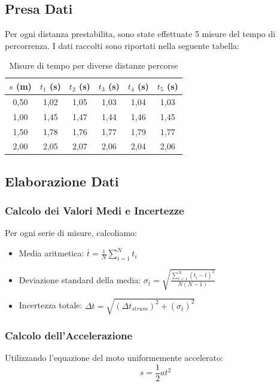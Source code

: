 \subsection{Presa Dati}
Per ogni distanza prestabilita, sono state effettuate 5 misure del tempo di percorrenza. I dati raccolti sono riportati nella seguente tabella:

\begin{table}[H]
\centering
\caption{Misure di tempo per diverse distanze percorse}
\label{tab:misure}
\begin{tabular}{cccccc}
\toprule
$s$ (m) & $t_1$ (s) & $t_2$ (s) & $t_3$ (s) & $t_4$ (s) & $t_5$ (s) \\
\midrule
0,50 & 1,02 & 1,05 & 1,03 & 1,04 & 1,03 \\
1,00 & 1,45 & 1,47 & 1,44 & 1,46 & 1,45 \\
1,50 & 1,78 & 1,76 & 1,77 & 1,79 & 1,77 \\
2,00 & 2,05 & 2,07 & 2,06 & 2,04 & 2,06 \\
\bottomrule
\end{tabular}
\end{table}

\subsection{Elaborazione Dati}

\subsubsection{Calcolo dei Valori Medi e Incertezze}
Per ogni serie di misure, calcoliamo:
\begin{itemize}
    \item Media aritmetica: $\bar{t} = \frac{1}{N}\sum_{i=1}^N t_i$
    \item Deviazione standard della media: $\sigma_{\bar{t}} = \sqrt{\frac{\sum_{i=1}^N (t_i-\bar{t})^2}{N(N-1)}}$
    \item Incertezza totale: $\Delta t = \sqrt{(\Delta t_{strum})^2 + (\sigma_{\bar{t}})^2}$
\end{itemize}

\subsubsection{Calcolo dell'Accelerazione}
Utilizzando l'equazione del moto uniformemente accelerato:
\begin{equation}
    s = \frac{1}{2}at^2
\end{equation}


